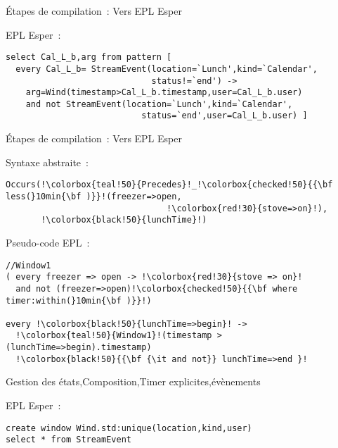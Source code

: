 \begin{frame}[fragile]{Étapes de compilation~: Vers EPL Esper}
\begin{minipage}{.52\linewidth}
\begin{coloredbox}[black]{\tiny EPL Esper~:}
\begin{lstlisting}[language=EPL,basicstyle=\ttfamily\tiny,escapechar=|]
select Cal_L_b,arg from pattern [ 
  every Cal_L_b= StreamEvent(location=`Lunch',kind=`Calendar',
                             status!=`end') ->
    arg=Wind(timestamp>Cal_L_b.timestamp,user=Cal_L_b.user) 
    and not StreamEvent(location=`Lunch',kind=`Calendar',
                           status=`end',user=Cal_L_b.user) ]
    \end{lstlisting}
\end{coloredbox}
\end{minipage}
\end{frame}
\begin{frame}[fragile]{Étapes de compilation~: Vers EPL Esper}
\addtocounter{framenumber}{-1}
  \begin{minipage}{.45\linewidth}
      \begin{coloredbox}[black]{\tiny Syntaxe abstraite~:}
      \begin{lstlisting}[language=Maloya,basicstyle=\ttfamily\tiny,escapechar=!]
Occurs(!\colorbox{teal!50}{Precedes}!_!\colorbox{checked!50}{{\bf less(}10min{\bf )}}!(freezer=>open,
                                !\colorbox{red!30}{stove=>on}!),
       !\colorbox{black!50}{lunchTime}!)
        \end{lstlisting}
      \end{coloredbox}
      \vfill
        \begin{coloredbox}[black]{\tiny Pseudo-code EPL~:}
          \begin{lstlisting}[language=EPLPseudoCode,basicstyle=\ttfamily\tiny,escapechar=!]
//Window1
( every freezer => open -> !\colorbox{red!30}{stove => on}!
  and not (freezer=>open)!\colorbox{checked!50}{{\bf where timer:within(}10min{\bf )}}!) 

every !\colorbox{black!50}{lunchTime=>begin}! ->
  !\colorbox{teal!50}{Window1}!(timestamp > (lunchTime=>begin).timestamp)
  !\colorbox{black!50}{{\bf {\it and not}} lunchTime=>end }!
\end{lstlisting}
\end{coloredbox}
  \end{minipage}
\hfill
\begin{minipage}{.52\linewidth}
   \begin{tiny}
    \colorbox{black!50}{Gestion des états},\colorbox{teal!50}{Composition},\colorbox{checked!50}{Timer explicites},\colorbox{red!30}{évènements}
  \end{tiny}
  \begin{coloredbox}[black]{\tiny EPL Esper~:}
   \begin{lstlisting}[language=EPL,basicstyle=\ttfamily\tiny,escapechar=|]
create window Wind.std:unique(location,kind,user) 
select * from StreamEvent 


\end{lstlisting}
\end{coloredbox}
\end{minipage}
\end{frame}
